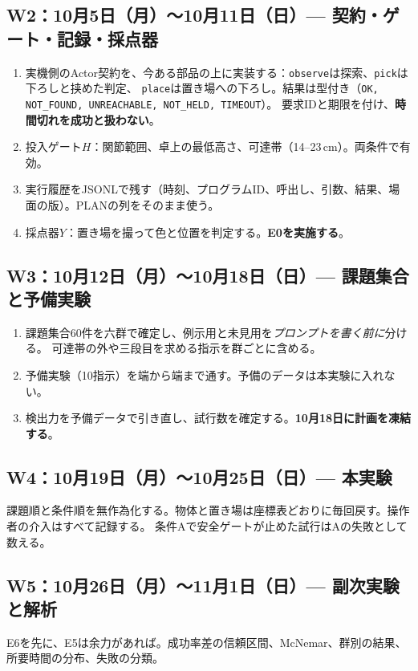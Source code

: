 \documentclass[11pt,a4paper]{article}
\begin{document}
\subsection*{W2：10月5日（月）〜10月11日（日）— 契約・ゲート・記録・採点器}
\begin{enumerate}
\item 実機側のActor契約を、今ある部品の上に実装する：\texttt{observe}は探索、\texttt{pick}は下ろしと挟めた判定、
\texttt{place}は置き場への下ろし。結果は型付き（\texttt{OK, NOT\_FOUND, UNREACHABLE, NOT\_HELD, TIMEOUT}）。
要求IDと期限を付け、\textbf{時間切れを成功と扱わない}。
\item 投入ゲート$H$：関節範囲、卓上の最低高さ、可達帯（14--23\,cm）。両条件で有効。
\item 実行履歴をJSONLで残す（時刻、プログラムID、呼出し、引数、結果、場面の版）。PLANの列をそのまま使う。
\item 採点器$Y$：置き場を撮って色と位置を判定する。\textbf{E0を実施する}。
\end{enumerate}

\subsection*{W3：10月12日（月）〜10月18日（日）— 課題集合と予備実験}
\begin{enumerate}
\item 課題集合60件を六群で確定し、例示用と未見用を\emph{プロンプトを書く前に}分ける。
可達帯の外や三段目を求める指示を群ごとに含める。
\item 予備実験（10指示）を端から端まで通す。予備のデータは本実験に入れない。
\item 検出力を予備データで引き直し、試行数を確定する。\textbf{10月18日に計画を凍結する}。
\end{enumerate}

\subsection*{W4：10月19日（月）〜10月25日（日）— 本実験}
課題順と条件順を無作為化する。物体と置き場は座標表どおりに毎回戻す。操作者の介入はすべて記録する。
条件Aで安全ゲートが止めた試行はAの失敗として数える。

\subsection*{W5：10月26日（月）〜11月1日（日）— 副次実験と解析}
E6を先に、E5は余力があれば。成功率差の信頼区間、McNemar、群別の結果、所要時間の分布、失敗の分類。
\end{document}
